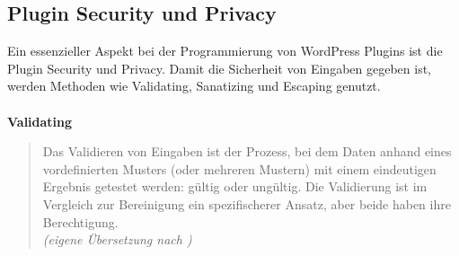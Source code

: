 \subsection{Plugin Security und Privacy}
Ein essenzieller Aspekt bei der Programmierung von WordPress Plugins ist die Plugin Security und Privacy.
Damit die Sicherheit von Eingaben gegeben ist, werden Methoden wie Validating, Sanatizing und Escaping genutzt.
\\\\
\textbf{Validating}

\begin{quote}
 Das Validieren von Eingaben ist der Prozess, bei dem Daten anhand eines vordefinierten Musters (oder mehreren Mustern) mit einem eindeutigen Ergebnis getestet werden: gültig oder ungültig.
 Die Validierung ist im Vergleich zur Bereinigung ein spezifischerer Ansatz, aber beide haben ihre Berechtigung.
 \\[0.5em]
 \emph{(eigene Übersetzung nach \cite{wordpress2024plugin_validation})}
\end{quote}

